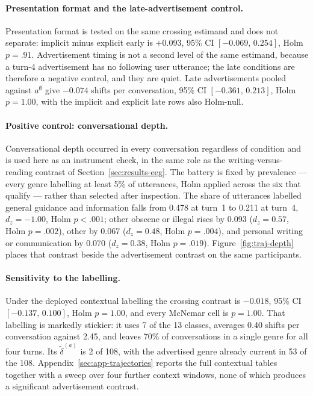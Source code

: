 \paragraph{Presentation format and the late-advertisement control.}
Presentation format is tested on the same crossing estimand and does not separate: implicit minus explicit early is \(+0.093\), 95\% CI \([-0.069,\,0.254]\), Holm \(p=.91\). Advertisement timing is not a second level of the same estimand, because a turn-4 advertisement has no following user utterance; the late conditions are therefore a negative control, and they are quiet. Late advertisements pooled against \(a^{\emptyset}\) give \(-0.074\) shifts per conversation, 95\% CI \([-0.361,\,0.213]\), Holm \(p=1.00\), with the implicit and explicit late rows also Holm-null.

\paragraph{Positive control: conversational depth.}
Conversational depth occurred in every conversation regardless of condition and is used here as an instrument check, in the same role as the writing-versus-reading contrast of Section~\ref{sec:results-eeg}. The battery is fixed by prevalence --- every genre labelling at least 5\% of utterances, Holm applied across the six that qualify --- rather than selected after inspection. The share of utterances labelled general guidance and information falls from 0.478 at turn~1 to 0.211 at turn~4, \(d_z=-1.00\), Holm \(p<.001\); other obscene or illegal rises by 0.093 (\(d_z=0.57\), Holm \(p=.002\)), other by 0.067 (\(d_z=0.48\), Holm \(p=.004\)), and personal writing or communication by 0.070 (\(d_z=0.38\), Holm \(p=.019\)). Figure~\ref{fig:traj-depth} places that contrast beside the advertisement contrast on the same participants.

\paragraph{Sensitivity to the labelling.}
Under the deployed contextual labelling the crossing contrast is \(-0.018\), 95\% CI \([-0.137,\,0.100]\), Holm \(p=1.00\), and every McNemar cell is \(p=1.00\). That labelling is markedly stickier: it uses 7 of the 13 classes, averages 0.40 shifts per conversation against 2.45, and leaves 70\% of conversations in a single genre for all four turns. Its \(\tilde{\delta}^{(a)}\) is 2 of 108, with the advertised genre already current in 53 of the 108. Appendix~\ref{sec:app-trajectories} reports the full contextual tables together with a sweep over four further context windows, none of which produces a significant advertisement contrast.

